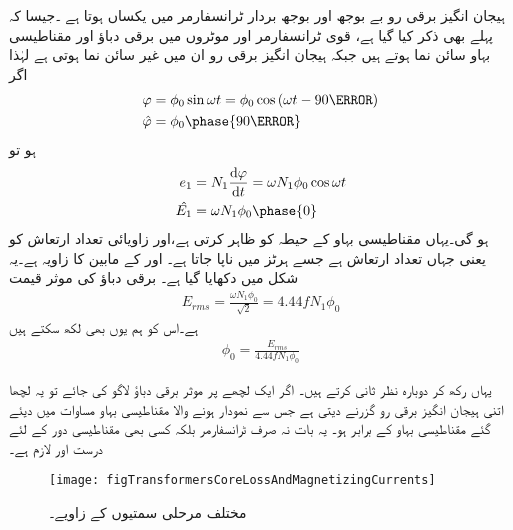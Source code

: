 ہیجان انگیز برقی رو بے بوجھ اور بوجھ بردار ٹرانسفارمر میں یکساں ہوتا ہے ۔جیسا کہ پہلے بھی ذکر کیا گیا ہے، قوی ٹرانسفارمر اور موٹروں میں برقی دباؤ اور مقناطیسی بہاو سائن نما ہوتے ہیں جبکہ ہیجان انگیز برقی رو ان میں غیر سائن نما ہوتی ہے لہٰذا اگر
\begin{gather}
\begin{aligned}
\varphi&=\phi_0 \sin \omega t=\phi_0 \cos \left(\omega t -90\degree \right)\\
\hat{\varphi}&=\phi_0 \phase{90\degree}
\end{aligned}
\end{gather}
ہو تو
\begin{gather}
\begin{aligned}\label{مساوات_ٹڑانسفارمر_دباؤ_سمتیہ}
e_1&=N_1 \frac{\dif \varphi}{\dif t}=\omega N_1 \phi_0 \cos \omega t\\
\hat{E_1}&=\omega N_1 \phi_0 \phase{0}
\end{aligned}
\end{gather}
ہو گی۔یہاں  مقناطیسی بہاو کے حیطہ کو ظاہر کرتی ہے،اور  زاویائی تعداد ارتعاش کو یعنی  جہاں  تعداد ارتعاش ہے جسے ہرٹز  میں ناپا جاتا ہے۔ اور  کے مابین  کا زاویہ ہے۔یہ شکل  میں دکھایا گیا ہے۔ برقی دباؤ  کی موثر قیمت   
\begin{align}
E_{rms}=\frac{\omega N_1 \phi_0}{\sqrt{2}}=4.44 f N_1 \phi_0
\end{align}
ہے۔اس کو ہم یوں بھی لکھ سکتے ہیں
\begin{align}\label{مساوات_ٹرانسفارمر_درکار_ہیجان_بہاو}
\phi_0=\frac{E_{rms}}{4.44 f N_1 \phi_0}
\end{align}

یہاں رکھ کر دوبارہ نظر ثانی کرتے ہیں۔ اگر ایک  لچھے پر  موثر برقی دباؤ لاگو کی جائے تو یہ لچھا اتنی ہیجان انگیز برقی رو  گزرنے دیتی ہے جس سے نمودار ہونے والا مقناطیسی بہاو مساوات   میں دیئے گئے مقناطیسی بہاو  کے برابر ہو۔ یہ بات نہ صرف ٹرانسفارمر بلکہ کسی بھی مقناطیسی دور کے لئے درست اور لازم ہے۔
\begin{figure}
\centering
\texttt{[image: figTransformersCoreLossAndMagnetizingCurrents]}
\caption{مختلف مرحلی سمتیوں کے زاویے۔}
\label{شکل_ٹرانسفارمر_مرکزی_ضیاع_اور_مقناطیسی_رو}
\end{figure}

